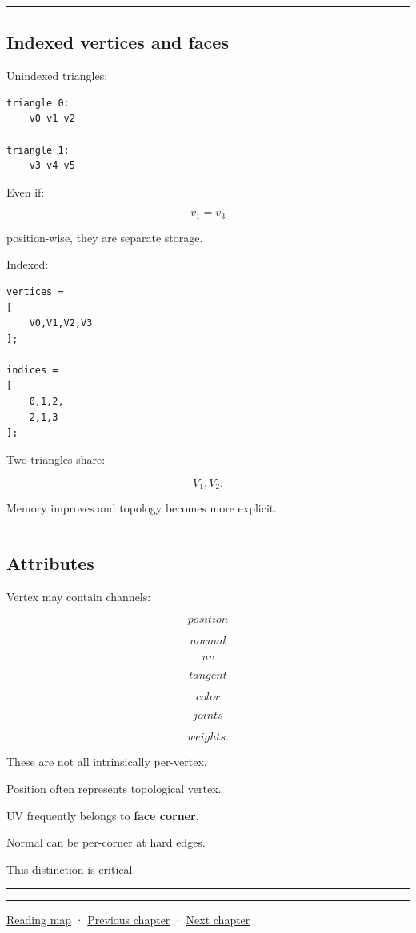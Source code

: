\begin{center}\rule{0.5\linewidth}{0.5pt}\end{center}

\subsection{Indexed vertices and faces}\label{04-visual-computing-ii-ch040-indexed-vertices-and-faces}

Unindexed triangles:

\begin{verbatim}
triangle 0:
    v0 v1 v2

triangle 1:
    v3 v4 v5
\end{verbatim}

Even if:

\[
v_1=v_3
\]

position-wise, they are separate storage.

Indexed:

\begin{verbatim}
vertices =
[
    V0,V1,V2,V3
];

indices =
[
    0,1,2,
    2,1,3
];
\end{verbatim}

Two triangles share:

\[
V_1,V_2.
\]

Memory improves and topology becomes more explicit.

\begin{center}\rule{0.5\linewidth}{0.5pt}\end{center}

\subsection{Attributes}\label{04-visual-computing-ii-ch040-attributes}

Vertex may contain channels:

\[
position
\]

\[
normal
\]

\[
uv
\]

\[
tangent
\]

\[
color
\]

\[
joints
\]

\[
weights.
\]

These are not all intrinsically per-vertex.

Position often represents topological vertex.

UV frequently belongs to \textbf{face corner}.

Normal can be per-corner at hard edges.

This distinction is critical.

\begin{center}\rule{0.5\linewidth}{0.5pt}\end{center}

\begin{center}\rule{0.5\linewidth}{0.5pt}\end{center}

\hyperref[volume-reading-map]{Reading map} · \hyperref[04-visual-computing-ii-ch039]{Previous chapter} · \hyperref[04-visual-computing-ii-ch041]{Next chapter}
